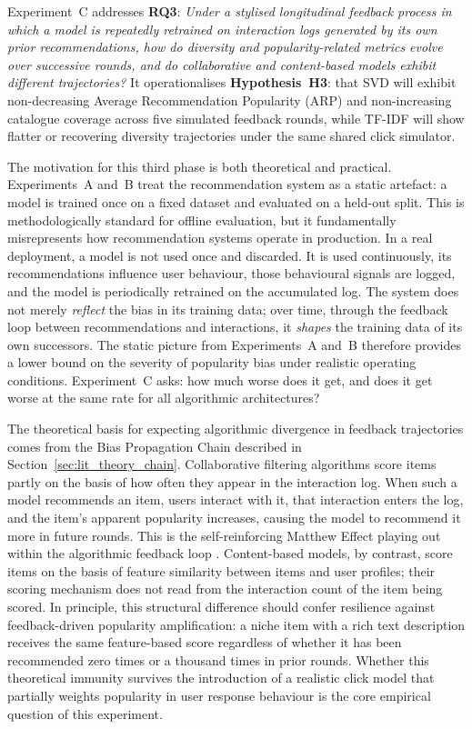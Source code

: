 \documentclass[11pt,a4paper]{report}
\begin{document}
Experiment~C addresses \textbf{RQ3}: \emph{Under a stylised longitudinal feedback process in which a model is repeatedly retrained on interaction logs generated by its own prior recommendations, how do diversity and popularity-related metrics evolve over successive rounds, and do collaborative and content-based models exhibit different trajectories?} It operationalises \textbf{Hypothesis~H3}: that SVD will exhibit non-decreasing Average Recommendation Popularity (ARP) and non-increasing catalogue coverage across five simulated feedback rounds, while TF-IDF will show flatter or recovering diversity trajectories under the same shared click simulator.

The motivation for this third phase is both theoretical and practical. Experiments~A and~B treat the recommendation system as a static artefact: a model is trained once on a fixed dataset and evaluated on a held-out split. This is methodologically standard for offline evaluation, but it fundamentally misrepresents how recommendation systems operate in production. In a real deployment, a model is not used once and discarded. It is used continuously, its recommendations influence user behaviour, those behavioural signals are logged, and the model is periodically retrained on the accumulated log. The system does not merely \emph{reflect} the bias in its training data; over time, through the feedback loop between recommendations and interactions, it \emph{shapes} the training data of its own successors. The static picture from Experiments~A and~B therefore provides a lower bound on the severity of popularity bias under realistic operating conditions. Experiment~C asks: how much worse does it get, and does it get worse at the same rate for all algorithmic architectures?

The theoretical basis for expecting algorithmic divergence in feedback trajectories comes from the Bias Propagation Chain described in Section~\ref{sec:lit_theory_chain}. Collaborative filtering algorithms score items partly on the basis of how often they appear in the interaction log. When such a model recommends an item, users interact with it, that interaction enters the log, and the item's apparent popularity increases, causing the model to recommend it more in future rounds. This is the self-reinforcing Matthew Effect \citep{merton1968social} playing out within the algorithmic feedback loop \citep{mansoury2020feedback, chaney2018algorithmic}. Content-based models, by contrast, score items on the basis of feature similarity between items and user profiles; their scoring mechanism does not read from the interaction count of the item being scored. In principle, this structural difference should confer resilience against feedback-driven popularity amplification: a niche item with a rich text description receives the same feature-based score regardless of whether it has been recommended zero times or a thousand times in prior rounds. Whether this theoretical immunity survives the introduction of a realistic click model that partially weights popularity in user response behaviour is the core empirical question of this experiment.
\end{document}
